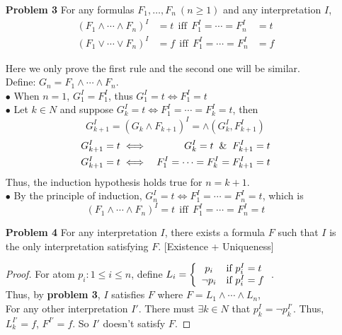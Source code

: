 \begin{enumerate}
\item[\textbf{Problem 3}] For any formulas $F_1, \ldots, F_n~(n \geq 1)$ and any interpretation $I$, 
\begin{eqnarray*}
 (F_1 \wedge \cdots \wedge F_n)^I &= t~~ \text{iff} ~~ F_1^I = \cdots = F_n^I &= t  \\
 (F_1 \vee \cdots \vee F_n)^I &= f~~ \text{iff} ~~ F_1^I = \cdots = F_n^I &= f 
\end{eqnarray*}

Here we only prove the first rule and the second one will be similar. \\
\noindent
Define: $G_n = F_1 \wedge \cdots \wedge F_n$. \\
$\bullet$ When $n = 1$, $G_1^I = F_1^I$, thus $G_1^I = t \iff F_1^I = t$  \\
$\bullet$ Let $k \in N$ and suppose $G_k^I = t \iff F_1^I = \cdots = F_k^I = t$, then
\begin{equation*}
    G_{k+1}^I = \left(G_k \wedge F_{k+1} \right)^I = \wedge \left(G_k^I, F_{k+1}^I \right)
\end{equation*}
\vspace{-30pt}
\begin{eqnarray*}
    G_{k+1}^I = t &\iff &G_k^I = t \And F_{k+1}^I = t  \\
    G_{k+1}^I = t &\iff & F_1^I = \cdots = F_k^I = F_{k+1}^I = t
\end{eqnarray*}
\hspace{10pt}Thus, the induction hypothesis holds true for $n = k+1$. \\
$\bullet$ By the principle of induction, $G_n^I = t \iff F_1^I = \cdots = F_n^I = t$, which is \\
\begin{equation*}
(F_1 \wedge \cdots \wedge F_n)^I = t~~ \text{iff} ~~ F_1^I = \cdots = F_n^I = t
\end{equation*}

\item[\textbf{Problem 4}] For any interpretation $I$, there exists a formula $F$ such that $I$ is the only interpretation satisfying $F$.  [Existence + Uniqueness]
\begin{proof}
For atom $p_i : 1 \leq i \leq n$, define 
$L_i=\left\{
    \begin{array}{c l}      
    p_i & \text{if } p_i^I = t\\
    \neg p_i & \text{if } p_i^I = f
\end{array}\right.$. \\
Thus, by \textbf{problem 3}, $I$ satisfies $F$ where $F = L_1 \wedge \cdots \wedge L_n$,  \\
For any other interpretation $I'$. There must $\exists k \in N$ that $p_k^{I} = \neg p_k^{I'}$. Thus, $L_k^{I'} = f$, $F^{I'} = f$. So $I'$ doesn't satisfy $F$. 
\end{proof}


\end{enumerate}
